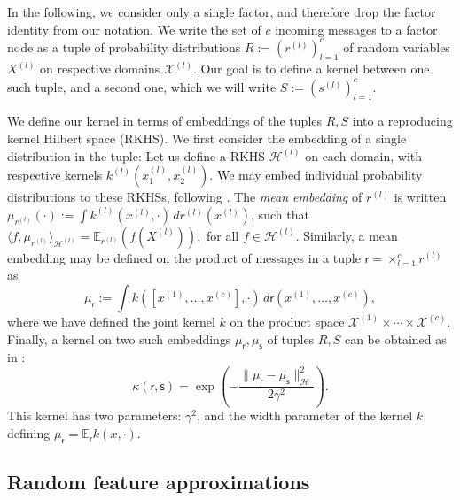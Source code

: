 \documentclass[english]{article}
\theoremstyle{plain}
\theoremstyle{plain}
\begin{document}
In the following, we consider only a single factor, and therefore drop the factor identity from our notation. We write the set of $c$ incoming messages to a factor node as a tuple of
probability distributions %
$R:=(r^{(l)})_{l=1}^c$ of random variables $X^{(l)}$ on respective  domains $\mathcal{X}^{(l)}$.
Our goal is to define a kernel between one such tuple, and a second one,
which we will write %
$S:=(s^{(l)})_{l=1}^c$.

We define our kernel in terms of embeddings of the tuples $R,S$ into a reproducing kernel Hilbert space (RKHS). We first consider the embedding of a single distribution
in the tuple: Let us define a RKHS
$\mathcal{H}^{(l)}$ on each domain, with respective kernels $k^{(l)}(x^{(l)}_1,x^{(l)}_2)$.
We may embed individual probability distributions to these RKHSs, following \citet{Smola2007}.
The {\em mean embedding} of $r^{(l)}$ is written
$\mu_{r^{(l)}}(\cdot) := \int k^{(l)}(x^{(l)},\cdot) \, dr^{(l)} (x^{(l)})$,
such that
$\langle f,\mu_{r^{(l)}} \rangle_{\mathcal{H}^{(l)}} = \mathbb{E}_{r^{(l)}}(f(X^{(l)})), $ for all $f\in \mathcal{H}^{(l)}$.
%
Similarly, a mean embedding may be defined on the product of  messages in a tuple
$\mathsf{r}=\times_{l=1}^{c}r^{(l)}$ as
%
\begin{equation}
\mu_{\mathsf{r}}
:=
\int k([x^{(1)}, \ldots, x^{(c)}],\cdot) \, d\mathsf{r}(x^{(1)}, \ldots, x^{(c)}),
\label{eq:featureOfTuple}
\end{equation}
where we have defined the joint kernel $k$ on the product space
$\mathcal{X}^{(1)}\times\cdots\times\mathcal{X}^{(c)}$.
Finally,  a kernel on two such embeddings $\mu_{\mathsf{r}},\mu_{\mathsf{s}}$ of tuples $R,S$ can be obtained as in \citet[eq. 9]{Christmann2010}:
%
\begin{equation}
\kappa(\mathsf{r}, \mathsf{s}) = \exp\left(-\frac{\|\mu_{\mathsf{r}}-\mu_{\mathsf{s}}\|_{\mathcal{H}}^{2}}{2\gamma^{2}}\right).
\label{eq:gauss_joint_emb}
\end{equation}
%
This kernel has two parameters: $\gamma^{2}$, and the width parameter of the kernel $k$ defining $\mu_{\mathsf{r}} = \mathbb{E}_{\mathsf{r}}k(x,\cdot)$.



\subsection{Random feature approximations}
\label{sec:randomFeatureApproximations}
\end{document}
